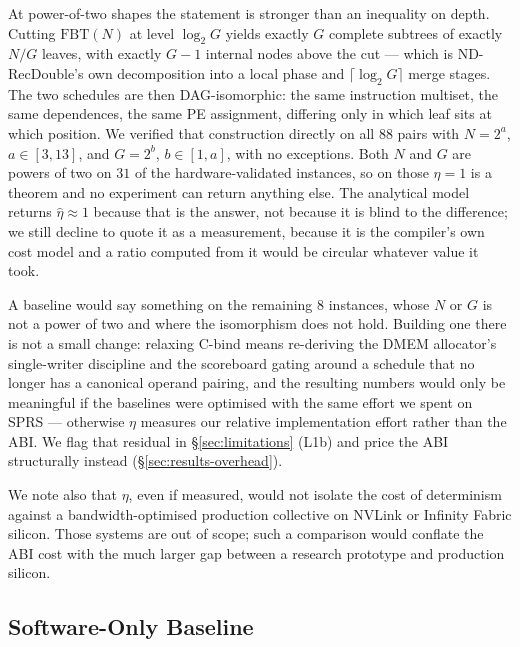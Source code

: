 \documentclass[journal,10pt]{IEEEtran}
\theoremstyle{plain}
\theoremstyle{definition}
\theoremstyle{remark}
\newcommand{\FBT}{\ensuremath{\mathrm{FBT}}}
\newcommand{\sprs}{\textsc{SPRS}}
\begin{document}
At power-of-two shapes the statement is stronger than an inequality on depth.
Cutting $\FBT(N)$ at level $\log_2 G$ yields exactly $G$ complete subtrees of
exactly $N/G$ leaves, with exactly $G-1$ internal nodes above the cut --- which
is ND-RecDouble's own decomposition into a local phase and
$\lceil\log_2 G\rceil$ merge stages. The two schedules are then
DAG-isomorphic: the same instruction multiset, the same dependences, the same
PE assignment, differing only in which leaf sits at which position. We verified
that construction directly on all $88$ pairs with $N = 2^a$, $a \in [3,13]$,
and $G = 2^b$, $b \in [1,a]$, with no exceptions. Both $N$ and $G$ are powers
of two on $31$ of the \TournNInst{} hardware-validated instances, so on those
$\eta = 1$ is a theorem and no experiment can return anything else. The
analytical model returns $\hat\eta \approx 1$ because that is the answer, not
because it is blind to the difference; we still decline to quote it as a
measurement, because it is the compiler's own cost model and a ratio computed
from it would be circular whatever value it took.

A baseline would say something on the remaining $8$ instances, whose $N$ or $G$
is not a power of two and where the isomorphism does not hold. Building one
there is not a small change: relaxing \textsf{C-bind} means re-deriving the
DMEM allocator's single-writer discipline and the scoreboard gating around a
schedule that no longer has a canonical operand pairing, and the resulting
numbers would only be meaningful if the baselines were optimised with the same
effort we spent on \sprs{} --- otherwise $\eta$ measures our relative
implementation effort rather than the ABI. We flag that residual in
\S\ref{sec:limitations} (L1b) and price the ABI structurally instead
(\S\ref{sec:results-overhead}).

We note also that $\eta$, even if measured, would not isolate the cost of
determinism against a bandwidth-optimised production collective on NVLink or
Infinity Fabric silicon. Those systems are out of scope; such a comparison
would conflate the ABI cost with the much larger gap between a research
prototype and production silicon.

\subsection{Software-Only Baseline}\label{sec:method-swbaseline}
\end{document}
